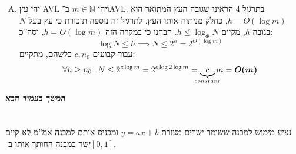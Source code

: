 \documentclass[]{article}
\newcommand\npage {\vfil {\hfil \textbf{\textit{המשך בעמוד הבא}}} \hfil \vfil \pagebreak}
\newcommand\N     {\mathbb{N}}
\begin{document}
\begin{enumerate}[(A)]
        \item יהי עץ AVL ויהי $m \in \N$ ב־AVL. בתרגול 4 הראינו שגובה העץ המתואר הוא $h = O(\log m)$, כחלק מניתוח אותו העץ. לתרגיל זה נוספה תזכורת כי עץ בעל $N$ בגובה $h$, מקיים $h \le \log_{\Phi}N$. הבחנו כי במקרה הזה $h = O(\log m)$, וסה''כ: 
        \[ \log N \le h \implies N \le 2^{h} = 2^{O(\log m)} \]
        עבור קבועים $c, n_0$ כלשהם, מתקיים: 
        \[ \forall n \ge n_0 \colon N \le 2^{c \log m} = 2^{c \log 2\log m} = \underbrace{c}_{\mathclap{constant}} m = \bm{O(m)} \]
        
    \end{enumerate}
    
    \npage
    \section{}
    נציע מימוש למבנה ששומר ישרים מצורת $y = ax + b$ ומכניס אותם למבנה אמ''מ לא קיים ישר במבנה החותך אותו ב־$[0, 1]$. 
    
\end{document}
